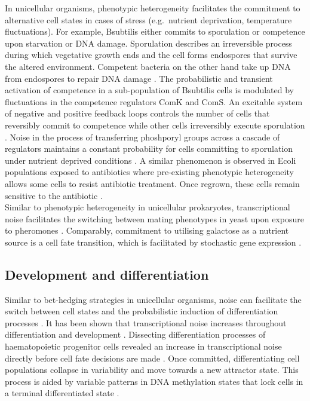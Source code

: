 In unicellular organisms, phenotypic heterogeneity facilitates the commitment to alternative cell states in cases of stress (e.g.~nutrient deprivation, temperature fluctuations). For example, \Gls{Bsubtilis} either commits to sporulation or competence upon starvation or DNA damage. Sporulation describes an irreversible process during which vegetative growth ends and the cell forms endospores that survive the altered environment. Competent bacteria on the other hand take up DNA from endospores to repair DNA damage \citep{Schultz2009}. The probabilistic and transient activation of competence in a sub-population of \Gls{Bsubtilis} cells is modulated by fluctuations in the competence regulators ComK and ComS. An excitable system of negative and positive feedback loops controls the number of cells that reversibly commit to competence while other cells irreversibly execute sporulation \citep{Suel2006}. Noise in the process of transferring phoshporyl groups across a cascade of regulators maintains a constant probability for cells committing to sporulation under nutrient deprived conditions \citep{Russell2017}. A similar phenomenon is observed in \Gls{Ecoli} populations exposed to antibiotics where pre-existing phenotypic heterogeneity allows some cells to resist antibiotic treatment. Once regrown, these cells remain sensitive to the antibiotic \citep{Balaban2004}. \\

Similar to phenotypic heterogeneity in unicellular prokaryotes, transcriptional noise facilitates the switching between mating phenotypes in yeast upon exposure to pheromones \citep{Paliwal2007}. Comparably, commitment to utilising galactose as a nutrient source is a cell fate transition, which is facilitated by stochastic gene expression \cite{Acar2008}. 

\subsection{Development and differentiation}

Similar to bet-hedging strategies in unicellular organisms, noise can facilitate the switch between cell states and the probabilistic induction of differentiation processes \citep{Eldar2010, Chang2008}. It has been shown that transcriptional noise increases throughout differentiation \citep{Stumpf2017} and development \citep{Antolovic2017}. Dissecting differentiation processes of haematopoietic progenitor cells revealed an increase in transcriptional noise directly before cell fate decisions are made \citep{Mojtahedi2016, Richard2016}. Once committed, differentiating cell populations collapse in variability and move towards a new attractor state. This process is aided by variable patterns in DNA methylation states that lock cells in a terminal differentiated state \citep{Jenkinson2017}. \\

